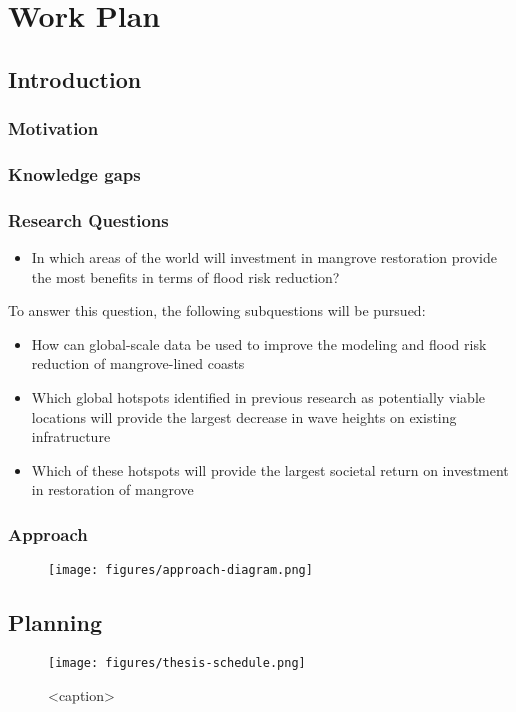 \chapter{Work Plan}


\section{Introduction}
\subsection{Motivation}
\subsection{Knowledge gaps}
\subsection{Research Questions}

\begin{itemize}
  \item In which areas of the world will investment in mangrove restoration provide the most benefits in terms of flood risk reduction?
\end{itemize}
To answer this question, the following subquestions will be pursued:

\begin{itemize}
  \item How can global-scale data be used to improve the modeling and flood risk reduction of mangrove-lined coasts
  \item Which global hotspots identified in previous research as potentially  viable locations will provide the largest decrease in wave heights on existing infratructure
  \item Which of these hotspots will provide the largest societal return on investment in restoration of mangrove
\end{itemize}

\subsection{Approach}
\begin{figure}
  \centering
  \label{fig:approach}
  \texttt{[image: figures/approach-diagram.png]}
\end{figure}


\section{Planning}

\begin{figure}[htbp]
  \centering
  \texttt{[image: figures/thesis-schedule.png]}
  \caption{<caption>}
  \label{<label>}
\end{figure}